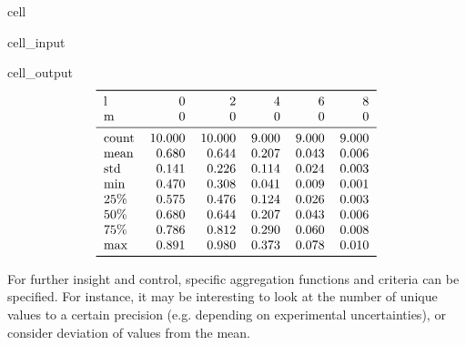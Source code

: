 \documentclass[letterpaper,table,10pt,english]{jupyterBook}
\begin{document}
\begin{sphinxuseclass}{cell}\begin{sphinxVerbatimInput}

\begin{sphinxuseclass}{cell_input}
\begin{sphinxVerbatim}[commandchars=\\\{\}]
\end{sphinxVerbatim}

\end{sphinxuseclass}\end{sphinxVerbatimInput}
\begin{sphinxVerbatimOutput}

\begin{sphinxuseclass}{cell_output}\begin{equation*}
\begin{split}\begin{tabular}{lrrrrr}
\toprule
l &       0 &       2 &      4 &      6 &      8 \\
m &       0 &       0 &      0 &      0 &      0 \\
\midrule
count &  10.000 &  10.000 &  9.000 &  9.000 &  9.000 \\
mean  &   0.680 &   0.644 &  0.207 &  0.043 &  0.006 \\
std   &   0.141 &   0.226 &  0.114 &  0.024 &  0.003 \\
min   &   0.470 &   0.308 &  0.041 &  0.009 &  0.001 \\
25\%   &   0.575 &   0.476 &  0.124 &  0.026 &  0.003 \\
50\%   &   0.680 &   0.644 &  0.207 &  0.043 &  0.006 \\
75\%   &   0.786 &   0.812 &  0.290 &  0.060 &  0.008 \\
max   &   0.891 &   0.980 &  0.373 &  0.078 &  0.010 \\
\bottomrule
\end{tabular}\end{split}
\end{equation*}
\end{sphinxuseclass}\end{sphinxVerbatimOutput}

\end{sphinxuseclass}
\sphinxAtStartPar
For further insight and control, specific aggregation functions and criteria can be specified. For instance, it may be interesting to look at the number of unique values to a certain precision (e.g. depending on experimental uncertainties), or consider deviation of values from the mean.
\end{document}
